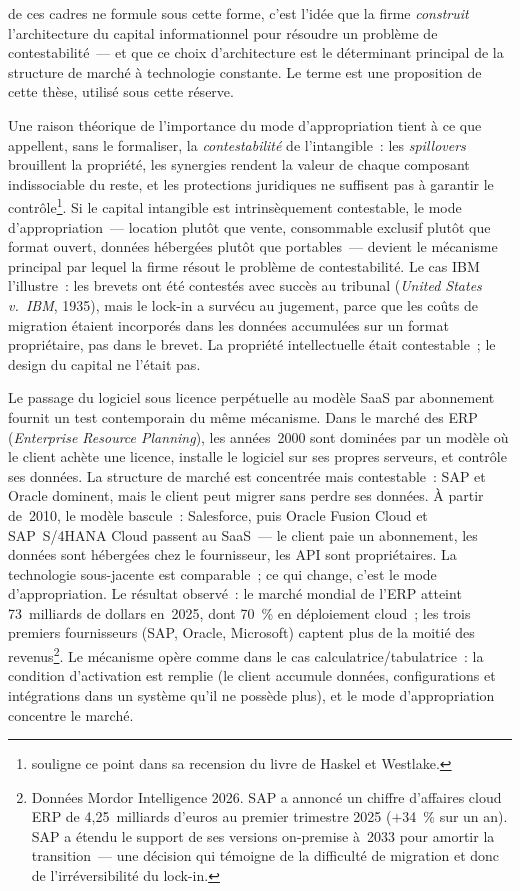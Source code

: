 de ces cadres ne formule sous cette forme, c'est l'idée que la firme \emph{construit} l'architecture du capital informationnel pour résoudre un problème de contestabilité~--- et que ce choix d'architecture est le déterminant principal de la structure de marché à technologie constante. Le terme est une proposition de cette thèse, utilisé sous cette réserve.

Une raison théorique de l'importance du mode d'appropriation tient à ce que \textcite{haskel_capitalism_2018} appellent, sans le formaliser, la \emph{contestabilité} de l'intangible~: les \emph{spillovers} brouillent la propriété, les synergies rendent la valeur de chaque composant indissociable du reste, et les protections juridiques ne suffisent pas à garantir le contrôle\footnote{\textcite{dumez_croissance_2018} souligne ce point dans sa recension du livre de Haskel et Westlake.}. Si le capital intangible est intrinsèquement contestable, le mode d'appropriation~--- location plutôt que vente, consommable exclusif plutôt que format ouvert, données hébergées plutôt que portables~--- devient le mécanisme principal par lequel la firme résout le problème de contestabilité. Le cas IBM l'illustre~: les brevets ont été contestés avec succès au tribunal (\emph{United States v.~IBM}, 1935), mais le lock-in a survécu au jugement, parce que les coûts de migration étaient incorporés dans les données accumulées sur un format propriétaire, pas dans le brevet. La propriété intellectuelle était contestable~; le design du capital ne l'était pas.

Le passage du logiciel sous licence perpétuelle au modèle SaaS par abonnement fournit un test contemporain du même mécanisme. Dans le marché des ERP (\emph{Enterprise Resource Planning}), les années~2000 sont dominées par un modèle où le client achète une licence, installe le logiciel sur ses propres serveurs, et contrôle ses données. La structure de marché est concentrée mais contestable~: SAP et Oracle dominent, mais le client peut migrer sans perdre ses données. À partir de~2010, le modèle bascule~: Salesforce, puis Oracle Fusion Cloud et SAP~S/4HANA Cloud passent au SaaS~--- le client paie un abonnement, les données sont hébergées chez le fournisseur, les API sont propriétaires. La technologie sous-jacente est comparable~; ce qui change, c'est le mode d'appropriation. Le résultat observé~: le marché mondial de l'ERP atteint 73~milliards de dollars en~2025, dont 70~\% en déploiement cloud~; les trois premiers fournisseurs (SAP, Oracle, Microsoft) captent plus de la moitié des revenus\footnote{Données Mordor Intelligence 2026. SAP a annoncé un chiffre d'affaires cloud ERP de 4,25~milliards d'euros au premier trimestre 2025 ($+$34~\% sur un an). SAP a étendu le support de ses versions on-premise à~2033 pour amortir la transition~--- une décision qui témoigne de la difficulté de migration et donc de l'irréversibilité du lock-in.}. Le mécanisme opère comme dans le cas calculatrice/tabulatrice~: la condition d'activation est remplie (le client accumule données, configurations et intégrations dans un système qu'il ne possède plus), et le mode d'appropriation concentre le marché.

